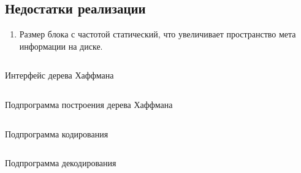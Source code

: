 \documentclass[12pt, a4paper]{article}
\begin{document}
\subsection{Недостатки реализации}
\begin{enumerate}
  \item Размер блока с частотой статический, что увеличивает пространство мета информации
  на диске.
\end{enumerate}

\begin{listing}
\inputminted{c}{src/htree.h}
\caption{Интерфейс дерева Хаффмана}
\label{listing:1}
\end{listing}

\begin{listing}
\inputminted[firstline=7, lastline=33]{c}{src/htree.c}
\caption{Подпрограмма построения дерева Хаффмана}
\label{listing:2}
\end{listing}

\begin{listing}
\inputminted[firstline=23, lastline=66]{c}{src/huff.c}
\caption{Подпрограмма кодирования}
\label{listing:3}
\end{listing}

\begin{listing}
\inputminted[firstline=74, lastline=107]{c}{src/huff.c}
\caption{Подпрограмма декодирования}
\label{listing:4}
\end{listing}
\end{document}

